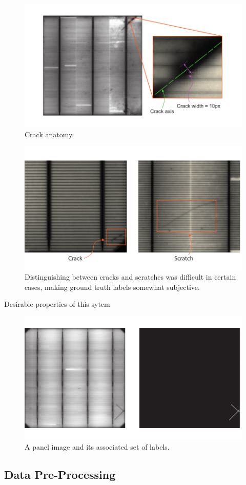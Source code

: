 \documentclass[11pt]{article} %
\begin{document}
\begin{figure}[h!]
\includegraphics{crack_width.pdf}
\caption{Crack anatomy.}
\label{fig:crack_width}
\end{figure}

\begin{figure}[h!]
\includegraphics{crack_v_scratch.pdf}
\caption{Distinguishing between cracks and scratches was difficult in certain cases, making ground truth labels somewhat subjective.}
\label{fig:crack_v_scratch}
\end{figure}
Desirable properties of this sytem

\begin{figure}[h!]
\includegraphics{mask_example.pdf}
\caption{A panel image and its associated set of labels.}
\label{fig:mask_example}
\end{figure}

\subsection{Data Pre-Processing}
\end{document}
